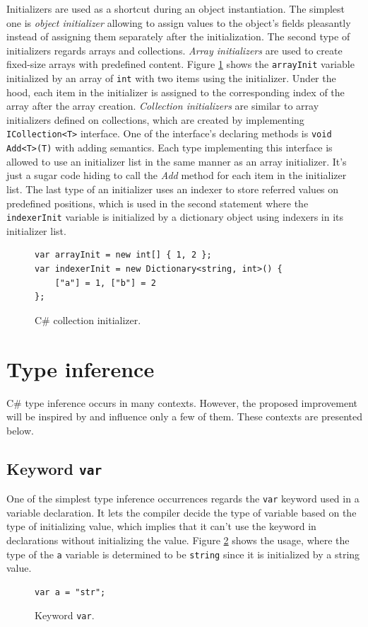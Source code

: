Initializers are used as a shortcut during an object instantiation.
The simplest one is \textit{object initializer} allowing to assign values to the object's fields pleasantly instead of assigning them separately after the initialization.
The second type of initializers regards arrays and collections.
\textit{Array initializers} are used to create fixed-size arrays with predefined content.
Figure \ref{img07:initializer} shows the \texttt{arrayInit} variable initialized by an array of \texttt{int} with two items using the initializer.
Under the hood, each item in the initializer is assigned to the corresponding index of the array after the array creation.
\textit{Collection initializers} are similar to array initializers defined on collections, which are created by implementing \texttt{ICollection<T>} interface.
One of the interface's declaring methods is \texttt{void Add<T>(T)} with adding semantics.
Each type implementing this interface is allowed to use an initializer list in the same manner as an array initializer.
It's just a sugar code hiding to call the \textit{Add} method for each item in the initializer list.
The last type of an initializer uses an indexer to store referred values on predefined positions, which is used in the second statement where the \texttt{indexerInit} variable is initialized by a dictionary object using indexers in its initializer list.
\begin{figure}[h]
\begin{lstlisting}[style=csharp]
var arrayInit = new int[] { 1, 2 };
var indexerInit = new Dictionary<string, int>() { 
    ["a"] = 1, ["b"] = 2 
};
\end{lstlisting}
\caption{C\# collection initializer.}
\label{img07:initializer}
\end{figure}

\section{Type inference} \label{sect02:typeInference}

C\# type inference occurs in many contexts. 
However, the proposed improvement will be inspired by and influence only a few of them.
These contexts are presented below.

\subsection{Keyword \texttt{var}}
One of the simplest type inference occurrences regards the \texttt{var} keyword used in a variable declaration.
It lets the compiler decide the type of variable based on the type of initializing value, which implies that it can’t use the keyword in declarations without initializing the value.
Figure \ref{img07:var} shows the usage, where the type of the \texttt{a} variable is determined to be \texttt{string} since it is initialized by a string value. 
\begin{figure}[h]
\begin{lstlisting}[style=csharp]
var a = "str";
\end{lstlisting}
\caption{Keyword \texttt{var}.}
\label{img07:var}
\end{figure}

